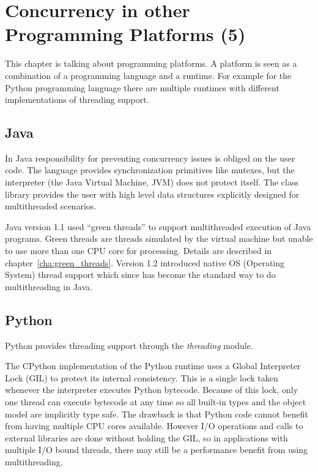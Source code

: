 \documentclass[bachelor,english]{hgbthesis}
\begin{document}
\chapter{Concurrency in other Programming Platforms (5)}

This chapter is talking about programming platforms. A platform is seen as a combination of a programming language and a runtime. For example for the Python programming language there are multiple runtimes with different implementations of threading support.

\section{Java}

In Java responsibility for preventing concurrency issues is obliged on the user code. The language provides synchronization primitives like mutexes, but the interpreter (the Java Virtual Machine, JVM) does not protect itself. The class library provides the user with high level data structures explicitly designed for multithreaded scenarios.

Java version 1.1 used ``green threads'' to support multithreaded execution of Java programs. Green threads are threads simulated by the virtual machine but unable to use more than one CPU core for processing. Details are described in chapter~\ref{cha:green_threads}. Version 1.2 introduced native OS (Operating System) thread support which since has become the standard way to do multithreading in Java\cite{JavaThreadManual}.

\section{Python}

Python provides threading support through the \textit{threading} module.

The CPython implementation of the Python runtime uses a Global Interpreter Lock (GIL) to protect its internal consistency\cite{PythonThreadingManual}. This is a single lock taken whenever the interpreter executes Python bytecode. Because of this lock, only one thread can execute bytecode at any time so all built-in types and the object model are implicitly type safe. The drawback is that Python code cannot benefit from having multiple CPU cores available. However I/O operations and calls to external libraries are done without holding the GIL, so in applications with multiple I/O bound threads, there may still be a performance benefit from using multithreading.
\end{document}
